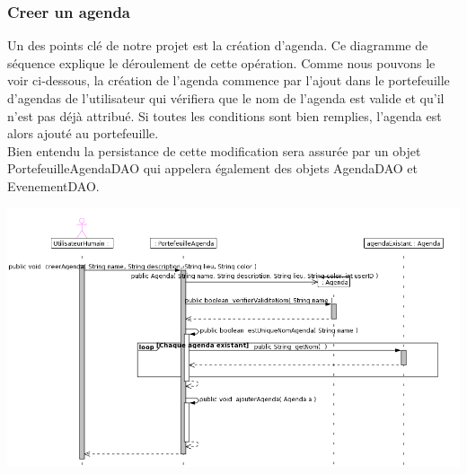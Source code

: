 \documentclass[12pt , a4paper]{article}
\begin{document}
\begin{landscape}
\subsubsection{Creer un agenda}
\noindent Un  des points clé de  notre projet est la  création d'agenda. Ce diagramme  de séquence explique  le déroulement de cette  opération. Comme nous pouvons  le voir ci-dessous, la  création de
l'agenda commence par  l'ajout dans le portefeuille d'agendas  de l'utilisateur qui vérifiera que  le nom de l'agenda est  valide et qu'il n'est pas  déjà attribué. Si toutes les  conditions sont bien
remplies, l'agenda est alors ajouté au portefeuille.\\
Bien entendu la persistance de cette modification sera assurée par un objet PortefeuilleAgendaDAO qui appelera également des objets AgendaDAO et EvenementDAO.
\begin{center}
  \includegraphics[scale=0.55]{./images/diag_seq_creer_agenda.png}
\end{center}
\end{landscape}
\end{document}
